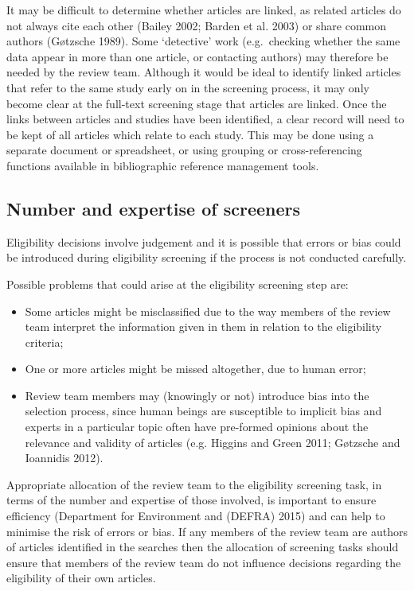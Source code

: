 \documentclass[
  letterpaper,
  DIV=11,
  numbers=noendperiod]{scrreprt}
\providecommand{\tightlist}{%
  \setlength{\itemsep}{0pt}\setlength{\parskip}{0pt}}
\begin{document}
It may be difficult to determine whether articles are linked, as related
articles do not always cite each other (Bailey 2002; Barden et al. 2003)
or share common authors (Gøtzsche 1989). Some `detective' work
(e.g.~checking whether the same data appear in more than one article, or
contacting authors) may therefore be needed by the review team. Although
it would be ideal to identify linked articles that refer to the same
study early on in the screening process, it may only become clear at the
full-text screening stage that articles are linked. Once the links
between articles and studies have been identified, a clear record will
need to be kept of all articles which relate to each study. This may be
done using a separate document or spreadsheet, or using grouping or
cross-referencing functions available in bibliographic reference
management tools.

\subsection{Number and expertise of
screeners}\label{number-and-expertise-of-screeners}

Eligibility decisions involve judgement and it is possible that errors
or bias could be introduced during eligibility screening if the process
is not conducted carefully.

Possible problems that could arise at the eligibility screening step
are:

\begin{itemize}
\tightlist
\item
  Some articles might be misclassified due to the way members of the
  review team interpret the information given in them in relation to the
  eligibility criteria;
\item
  One or more articles might be missed altogether, due to human error;
\item
  Review team members may (knowingly or not) introduce bias into the
  selection process, since human beings are susceptible to implicit bias
  and experts in a particular topic often have pre-formed opinions about
  the relevance and validity of articles (e.g. Higgins and Green 2011;
  Gøtzsche and Ioannidis 2012).
\end{itemize}

Appropriate allocation of the review team to the eligibility screening
task, in terms of the number and expertise of those involved, is
important to ensure efficiency (Department for Environment and (DEFRA)
2015) and can help to minimise the risk of errors or bias. If any
members of the review team are authors of articles identified in the
searches then the allocation of screening tasks should ensure that
members of the review team do not influence decisions regarding the
eligibility of their own articles.
\end{document}
